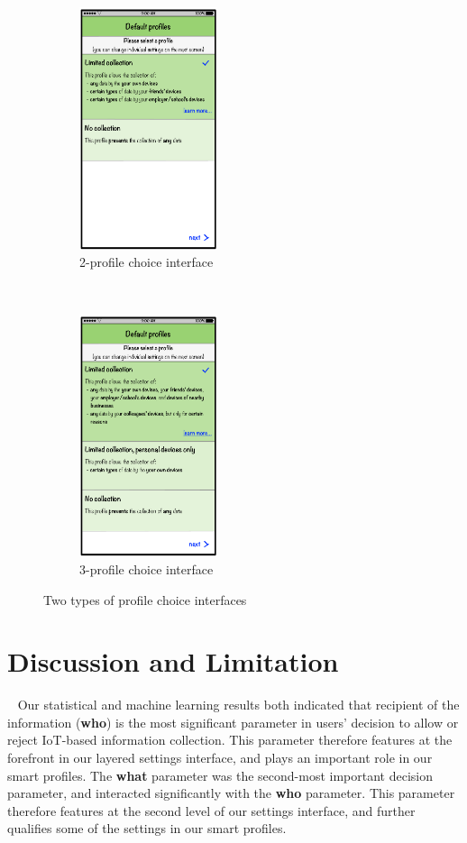 \begin{figure}
	\centering
	\begin{subfigure}[t]{0.48\textwidth}
		\centering
		\includegraphics[height=2.8in]{figures/profiles2.pdf}
		\caption{2-profile choice interface}
		\label{fig:2profile_default_setting}
	\end{subfigure}%
	~~
	\begin{subfigure}[t]{0.48\textwidth}
		\centering
		\includegraphics[height=2.8in]{figures/profiles3.pdf}
		\caption{3-profile choice interface}
		\label{fig:3profile_default_setting}
	\end{subfigure}%
	\caption{Two types of profile choice interfaces}
\end{figure}

\section{Discussion and Limitation}~\label{sec:publiclim}
Our statistical and machine learning results both indicated that recipient of the information (\textbf{who}) is the most significant parameter in users' decision to allow or reject IoT-based information collection. This parameter therefore features at the forefront in our layered settings interface, and plays an important role in our smart profiles. The \textbf{what} parameter was the second-most important decision parameter, and interacted significantly with the \textbf{who} parameter. This parameter therefore features at the second level of our settings interface, and further qualifies some of the settings in our smart profiles.

